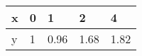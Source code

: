\documentclass{article}
\begin{document}
\begin{table}[h!]
\begin{tabular}{l|l|l|l|l}

\multicolumn{1}{p{30.865313pt}}{\raggedright x} & \multicolumn{1}{|p{30.865313pt}}{\raggedright 0} & \multicolumn{1}{|p{30.865313pt}}{\raggedright 1} & \multicolumn{1}{|p{30.1125pt}}{\raggedright 2} & \multicolumn{1}{|p{30.1125pt}}{\raggedright 4}\\ 
\hline 
\multicolumn{1}{p{30.865313pt}}{\raggedright y} & \multicolumn{1}{|p{30.865313pt}}{\raggedright 1} & \multicolumn{1}{|p{30.865313pt}}{\raggedright 0.96} & \multicolumn{1}{|p{30.1125pt}}{\raggedright 1.68} & \multicolumn{1}{|p{30.1125pt}}{\raggedright 1.82}\\ 


\end{tabular}
\end{table}
\end{document}
